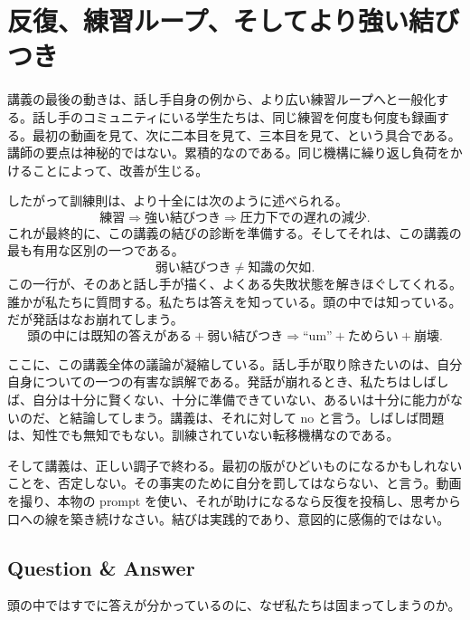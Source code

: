 \section{反復、練習ループ、そしてより強い結びつき}

講義の最後の動きは、話し手自身の例から、より広い練習ループへと一般化する。話し手のコミュニティにいる学生たちは、同じ練習を何度も何度も録画する。最初の動画を見て、次に二本目を見て、三本目を見て、という具合である。講師の要点は神秘的ではない。累積的なのである。同じ機構に繰り返し負荷をかけることによって、改善が生じる。

したがって訓練則は、より十全には次のように述べられる。
\begin{equation}
\text{練習} \Longrightarrow \text{強い結びつき} \Longrightarrow \text{圧力下での遅れの減少}.
\end{equation}
これが最終的に、この講義の結びの診断を準備する。そしてそれは、この講義の最も有用な区別の一つである。
\begin{equation}
\text{弱い結びつき} \neq \text{知識の欠如}.
\end{equation}
この一行が、そのあと話し手が描く、よくある失敗状態を解きほぐしてくれる。誰かが私たちに質問する。私たちは答えを知っている。頭の中では知っている。だが発話はなお崩れてしまう。
\begin{equation}
\text{頭の中には既知の答えがある} + \text{弱い結びつき} \Longrightarrow \text{``um''} + \text{ためらい} + \text{崩壊}.
\end{equation}

ここに、この講義全体の議論が凝縮している。話し手が取り除きたいのは、自分自身についての一つの有害な誤解である。発話が崩れるとき、私たちはしばしば、自分は十分に賢くない、十分に準備できていない、あるいは十分に能力がないのだ、と結論してしまう。講義は、それに対して no と言う。しばしば問題は、知性でも無知でもない。訓練されていない転移機構なのである。

そして講義は、正しい調子で終わる。最初の版がひどいものになるかもしれないことを、否定しない。その事実のために自分を罰してはならない、と言う。動画を撮り、本物の prompt を使い、それが助けになるなら反復を投稿し、思考から口への線を築き続けなさい。結びは実践的であり、意図的に感傷的ではない。

\subsection{Question \& Answer}

頭の中ではすでに答えが分かっているのに、なぜ私たちは固まってしまうのか。


